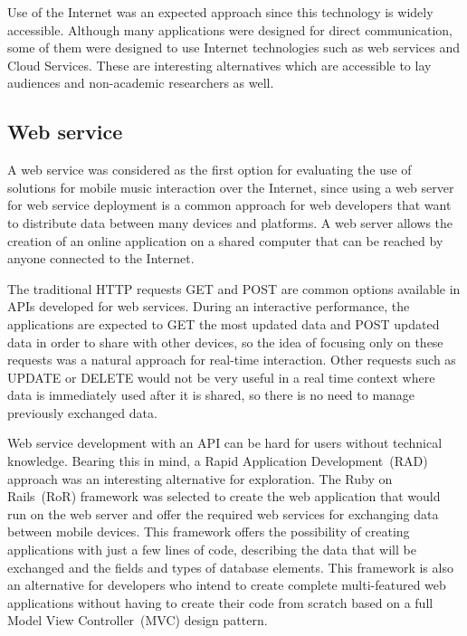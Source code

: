 Use of the Internet was an expected approach since this technology is widely accessible.
Although many applications were designed for direct communication, some of them were designed to use Internet technologies such as web services and Cloud Services. These are interesting alternatives which are accessible to lay audiences and non-academic researchers as well.

\subsection*{Web service}
 
A web service was considered as the first option for evaluating the use of solutions for mobile music interaction over the Internet, since
using a web server for web service deployment is a common approach for web developers that want to distribute data between many devices and platforms.
A web server allows the creation of an online application on a shared computer that can be reached by anyone connected to the Internet.


The traditional HTTP requests GET and POST are common options available in APIs developed for web services.
During an interactive performance, the applications are expected to GET the most updated data and POST updated data in order to share with other devices, so the idea of focusing only on these requests was a natural approach for real-time interaction.
Other requests such as UPDATE or DELETE would not be very useful in a real time context where data is immediately used after it is shared, so there is no need to manage previously exchanged data.

Web service development with an API can be hard for users without technical knowledge.
Bearing this in mind, a Rapid Application Development~(RAD) approach was an interesting alternative for exploration.
The Ruby on Rails~(RoR) framework was selected to create the web application that would run on the web server and offer the required web services for exchanging data between mobile devices.
This framework offers the possibility of creating applications with just a few lines of code, describing the data that will be exchanged and the fields and types of database elements.
This framework is also an alternative for developers who intend to create complete multi-featured web applications without having to create their code from scratch based on a full Model View Controller~(MVC) design pattern.


